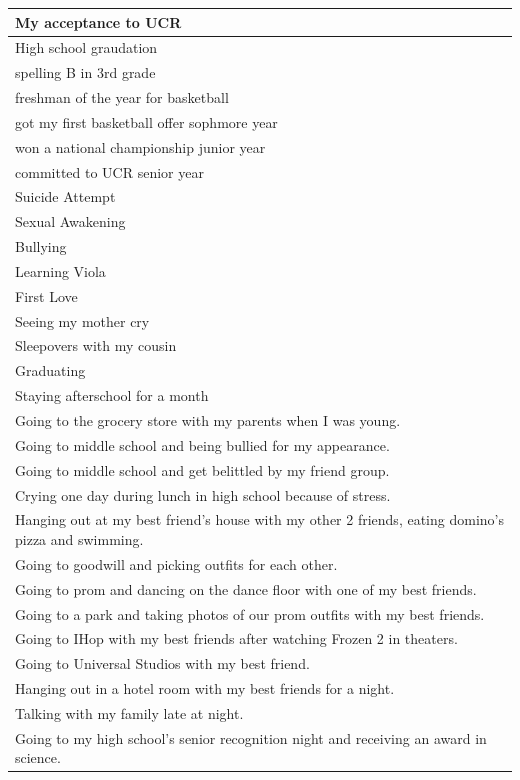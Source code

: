 \documentclass[
  .7em,
  letterpaper,
  DIV=11,
  numbers=noendperiod]{scrartcl}
\begin{document}
\begin{table}
\begin{tabular}{l}
My acceptance to UCR\\
\hline
High school graudation\\
\hline
spelling B in 3rd grade\\
\hline
freshman of the year for basketball\\
\hline
got my first basketball offer sophmore year\\
\hline
won a national championship junior year\\
\hline
committed to UCR senior year\\
\hline
Suicide Attempt\\
\hline
Sexual Awakening\\
\hline
Bullying\\
\hline
Learning Viola\\
\hline
First Love\\
\hline
Seeing my mother cry\\
\hline
Sleepovers with my cousin\\
\hline
Graduating\\
\hline
Staying afterschool for a month\\
\hline
Going to the grocery store with my parents when I was young.\\
\hline
Going to middle school and being bullied for my appearance.\\
\hline
Going to middle school and get belittled by my friend group.\\
\hline
Crying one day during lunch in high school because of stress.\\
\hline
Hanging out at my best friend's house with my other 2 friends, eating domino's pizza and swimming.\\
\hline
Going to goodwill and picking outfits for each other.\\
\hline
Going to prom and dancing on the dance floor with one of my best friends.\\
\hline
Going to a park and taking photos of our prom outfits with my best friends.\\
\hline
Going to IHop with my best friends after watching Frozen 2 in theaters.\\
\hline
Going to Universal Studios with my best friend.\\
\hline
Hanging out in a hotel room with my best friends for a night.\\
\hline
Talking with my family late at night.\\
\hline
Going to my high school's senior recognition night and receiving an award in science.\\

\end{tabular}
\end{table}
\end{document}
